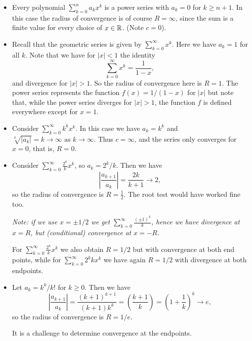 \documentclass[10pt, a4paper]{article}
\newcommand{\limas}[3][n]{#2 \rightarrow #3 \text{ as } #1 \rightarrow \infty}
\newcommand{\infsumo}[1][k = 0]{\sum_{#1}^{\infty}}
\begin{document}
\begin{example}\phantom{}
    \begin{itemize}
        \item Every polynomial $\sum_{k = 0}^{n}a_kx ^ k$ is a power series with $a_k = 0$ for $k \geq n + 1$.
        In this case the radius of convergence is of course $R = \infty$,
        since the sum is a finite value for every choice of $x \in \mathbb{R}$.
        (Note $c = 0$).

        \item Recall that the geometric series is given by $\infsumo x ^ k$.
        Here we have $a_k = 1$ for all $k$.
        Note that we have for $|x| < 1$ the identity
        \[
        \infsumo x ^ k = \frac{1}{1 - x},
        \]
        and divergence for $|x| > 1$.
        So the radius of convergence here is $R = 1$.
        The power series represents the function $f(x) = 1 / (1 - x)$ for $|x|$ but note that,
        while the power series diverges for $|x| > 1$,
        the function $f$ is defined everywhere except for $x = 1$.

        \item Consider $\infsumo k ^ kx ^ k$.
        In this case we have $a_k = k ^ k$ and $\limas[k]{\sqrt[k]{|a_k|} = k}{\infty}$.
        Thus $c = \infty$,
        and the series only converges for $x = 0$,
        that is,
        $R = 0$.

        \item Consider $\infsumo\frac{2 ^ k}{k}x ^ k$,
        so $a_k = 2 ^ k / k$.
        Then we have
        \[
        \left|\frac{a_{k + 1}}{a_k}\right| = \frac{2k}{k + 1} \rightarrow 2,
        \]
        so the radius of convergence is $R = \frac{1}{2}$.
        The root test would have worked fine too.
        
        \textit{Note: if we use $x = \pm 1 / 2$ we get $\infsumo\frac{(\pm 1) ^ k}{k}$,
        hence we have divergence at $x = R$,
        but
        (conditional)
        convergence at $x = -R$.}

        For $\infsumo\frac{2 ^ k}{k}x ^ k$ we also obtain $R = 1 / 2$ but with convergence at both end points,
        while for $\infsumo 2 ^ kk x ^ k$ we have again $R = 1 / 2$ with divergence at both endpoints.
        
        \item Let $a_k = k ^ k / k!$ for $k \geq 0$.
        Then we have
        \[
        \left|\frac{a_{k + 1}}{a_k}\right| = \frac{(k + 1) ^ {k + 1}}{(k + 1)k ^ k} = \left(\frac{k + 1}{k}\right) = \left(1 + \frac{1}{k}\right) ^ k \rightarrow e,
        \]
        so the radius of convergence is $R = 1 / e$.
        
        It is a challenge to determine convergence at the endpoints.
    \end{itemize}
\end{example}
\end{document}
